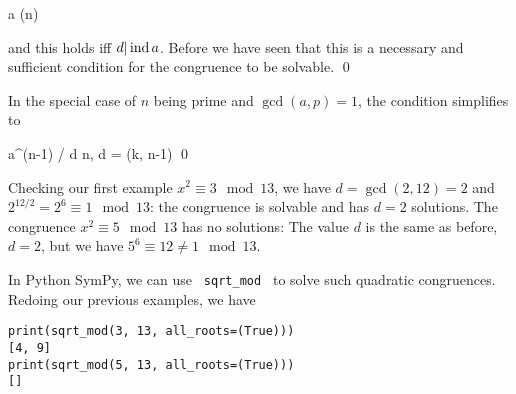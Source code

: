 \bee
{} \ind a  \mod \phi(n)
\eee

and this holds iff $d |\operatorname{ind} a$. Before we have seen that this is a necessary and sufficient condition for the congruence to be solvable. \qed

In the special case of $n$ being prime and $\gcd(a,p) = 1$, the condition simplifies to

\bee
a^{(n-1) / d}  \mod n, \quad d = \gcd(k, n-1) \qed
\eee

Checking our first example $x^2 \equiv 3 \mod 13$, we have $d = \gcd(2, 12) = 2$ and $2^{12/2} = 2^6 \equiv 1 \mod 13$: the congruence is solvable and has $d = 2$ solutions. The congruence $x^2 \equiv 5 \mod 13$ has no solutions: The value $d$ is the same as before, $d = 2$, but we have $5^6 \equiv 12 \neq 1 \mod 13$.

In Python SymPy, we can use \verb+ sqrt_mod + to solve such quadratic congruences. Redoing our previous examples, we have

\begin{verbatim}
print(sqrt_mod(3, 13, all_roots=(True)))
[4, 9]
print(sqrt_mod(5, 13, all_roots=(True)))
[]
\end{verbatim}



